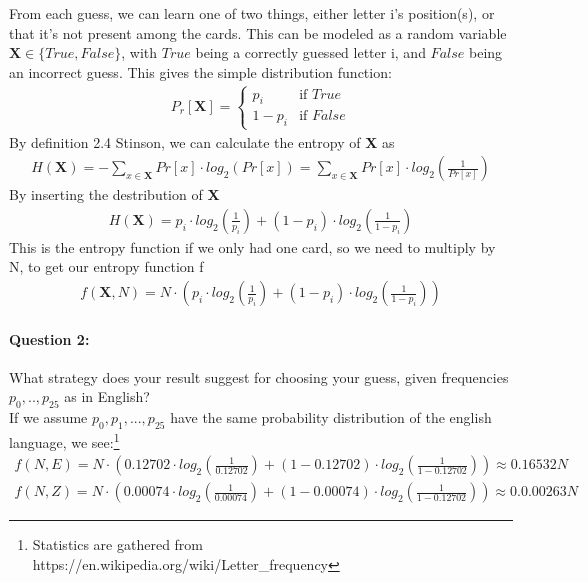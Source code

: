 \documentclass[paper=a4, fontsize=11pt]{scrartcl} %
\numberwithin{equation}{section} %
\numberwithin{figure}{section} %
\numberwithin{table}{section} %
\begin{document}
	From each guess, we can learn one of two things, either letter i's position(s), or that it's not present among the cards. This can be modeled as a random variable $\mathbf{X}\in\{True, False\}$, with $True$ being a correctly guessed letter i, and $False$ being an incorrect guess. This gives the simple distribution function:
	\begin{align*}
	P_r[\mathbf{X}]=
	\begin{cases}
	p_i &\text{if } True \\
	1-p_i&\text{if } False
	\end{cases}
	\end{align*}
	By definition 2.4 Stinson, we can calculate the entropy of \textbf{X} as
	\begin{align*}
	H(\mathbf{X})=-\sum_{x\in\mathbf{X}}Pr[x]\cdot log_2(Pr[x])=\sum_{x\in\mathbf{X}}Pr[x]\cdot log_2\left(\frac{1}{Pr[x]}\right)
	\end{align*}
	By inserting the  destribution of \textbf{X}
	\begin{align*}
	H(\mathbf{X})=p_i\cdot log_2\left(\frac{1}{p_i}\right)+(1-p_i)\cdot log_2\left(\frac{1}{1-p_i}\right)
	\end{align*}
	This is the entropy function if we only had one card, so we need to multiply by N, to get our entropy function f
	\begin{align*}
	f(\mathbf{X},N)=N\cdot(p_i\cdot log_2\left(\frac{1}{p_i}\right)+(1-p_i)\cdot log_2\left(\frac{1}{1-p_i}\right))
	\end{align*}
	
	\paragraph{Question 2: }What strategy does your result suggest  for choosing your guess, given frequencies $p_0,..,p_{25}$ as in English? \\

	If we assume $p_0, p_1,..., p_{25}$ have the same probability distribution of the english language, we see:\footnote{Statistics are gathered from https://en.wikipedia.org/wiki/Letter\_frequency}
	\begin{align*}
	f(N,E)=N\cdot (0.12702\cdot log_2(\frac{1}{0.12702}) + (1-0.12702)\cdot log_2\left(\frac{1}{1-0.12702}\right))\approx0.16532N \\
	f(N,Z)=N\cdot (0.00074\cdot log_2(\frac{1}{0.00074}) + (1-0.00074)\cdot log_2\left(\frac{1}{1-0.12702}\right))\approx0.0.00263N
	\end{align*}
	
\end{document}
